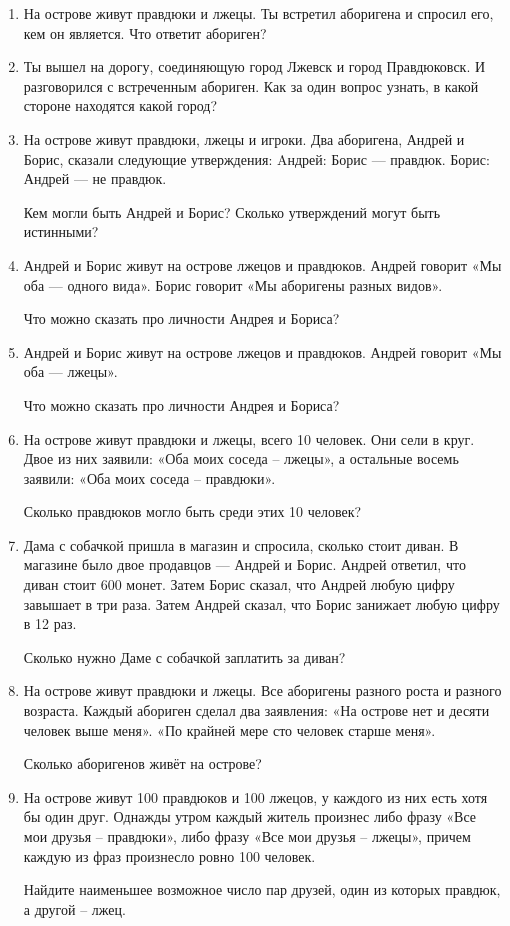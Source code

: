 \documentclass[12pt]{article}
\theoremstyle{definition}
\begin{document}
\begin{enumerate}
  \item На острове живут правдюки и лжецы. 
  Ты встретил аборигена и спросил его, кем он является. Что ответит абориген? 
  
  \item Ты вышел на дорогу, соединяющую город Лжевск и город Правдюковск. И разговорился с встреченным абориген. 
  Как за один вопрос узнать, в какой стороне находятся какой город?
  
  \item На острове живут правдюки, лжецы и игроки. Два аборигена, Андрей и Борис, сказали следующие утверждения:
  Aндрей: Борис — правдюк.
  Борис: Андрей — не правдюк.

  Кем могли быть Андрей и Борис? Сколько утверждений могут быть истинными?


  \item Андрей и Борис живут на острове лжецов и правдюков. Андрей говорит «Мы оба — одного вида». 
  Борис говорит «Мы аборигены разных видов».
  
  Что можно сказать про личности Андрея и Бориса?

  \item Андрей и Борис живут на острове лжецов и правдюков. Андрей говорит «Мы оба — лжецы». 
  
  Что можно сказать про личности Андрея и Бориса?


  \item На острове живут правдюки и лжецы, всего 10 человек. Они сели в круг. 
  Двое из них заявили: «Оба моих соседа – лжецы», а остальные восемь заявили: «Оба моих соседа – правдюки». 
  
  Сколько правдюков могло быть среди этих 10 человек? 


  \item Дама с собачкой пришла в магазин и спросила, сколько стоит диван. 
  В магазине было двое продавцов — Андрей и Борис. Андрей ответил, что диван стоит 600 монет.
  Затем Борис сказал, что Андрей любую цифру завышает в три раза.
  Затем Андрей сказал, что Борис занижает любую цифру в 12 раз.

  Сколько нужно Даме с собачкой заплатить за диван?

  \item На острове живут правдюки и лжецы. Все аборигены разного роста и разного возраста. Каждый абориген сделал два заявления:
  «На острове нет и десяти человек выше меня». «По крайней мере сто человек старше меня».

  Сколько аборигенов живёт на острове?


  \item На острове живут 100 правдюков и 100 лжецов, у каждого из них есть хотя бы один друг. 
  Однажды утром каждый житель произнес либо фразу «Все мои друзья – правдюки», либо фразу «Все мои друзья – лжецы», 
  причем каждую из фраз произнесло ровно 100 человек. 
  
  Найдите наименьшее возможное число пар друзей, один из которых правдюк, а другой – лжец. 



\end{enumerate}
\end{document}
